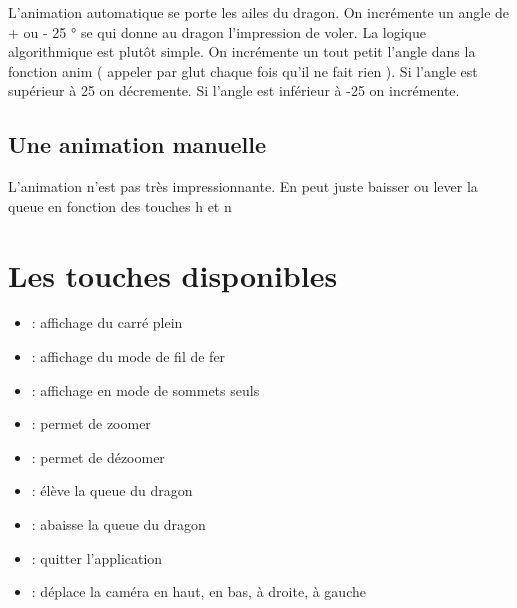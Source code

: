 \documentclass{article}
\begin{document}
L'animation automatique se porte les ailes du dragon. On incrémente un angle de + ou - 25 ° se qui donne au dragon l'impression de voler. La logique algorithmique est plutôt simple. On incrémente un tout petit l'angle dans la fonction anim ( appeler par glut chaque fois qu'il ne fait rien ). Si l'angle est supérieur à 25 on décremente. Si l'angle est inférieur à -25 on incrémente. 
 
\subsection{Une animation manuelle}

L'animation n'est pas très impressionnante. En peut juste baisser ou lever la queue en fonction des touches h et n


\section{Les touches disponibles}

\begin{itemize}
\item {} : affichage du carré plein
\item {} : affichage du mode de fil de fer
\item {} : affichage en mode de sommets seuls
\item {} : permet de zoomer
\item {} : permet de dézoomer 
\item {} : élève la queue du dragon
\item {} : abaisse la queue du dragon 
\item {} : quitter l'application 
\item \UArrow \DArrow \LArrow \RArrow : déplace la caméra en haut, en bas, à droite, à gauche

\end{itemize}

\end{document}
